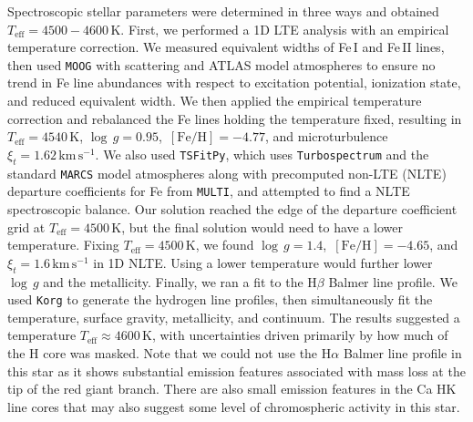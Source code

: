 \documentclass{natureprintstyle}
\newcommand{\code}[1]{\texttt{#1}\xspace}
\newcommand{\unit}[1]{\ensuremath{\mathrm{\,#1}}\xspace}
\newcommand{\feh}{\unit{[Fe/H]}}
\newcommand{\teff}{\ensuremath{T_\mathrm{eff}}\xspace}
\newcommand{\Teff}{\teff}
\newcommand{\logg}{\ensuremath{\log\,g}\xspace}
\newcommand{\kms}{\unit{km\,s^{-1}}}
\begin{document}
Spectroscopic stellar parameters were determined in three ways and obtained $\Teff = 4500-4600$\,K.
First, we performed a 1D LTE analysis with an empirical temperature correction\cite{Frebel2013}.
We measured equivalent widths of Fe\,I and Fe\,II lines, then used \code{MOOG} with scattering\cite{Sneden1973,Sobeck2011,Sneden2012} and ATLAS model atmospheres\cite{Kurucz1979,Castelli2003} to ensure no trend in Fe line abundances with respect to excitation potential, ionization state, and reduced equivalent width.
We then applied the empirical temperature correction and rebalanced the Fe lines holding the temperature fixed, resulting in $\Teff=4540$\,K, $\logg=0.95$, $\feh=-4.77$, and microturbulence $\xi_t = 1.62\kms$.
We also used \code{TSFitPy}{\cite{Gerber2023}}, which uses \code{Turbospectrum}{\cite{Plez2012}} and the standard \code{MARCS} model atmospheres\cite{Gustafsson2008} along with precomputed non-LTE (NLTE) departure coefficients for Fe\cite{Bergemann2012b} from \code{MULTI}{\cite{Carlsson1986}}, and attempted to find a NLTE spectroscopic balance. Our solution reached the edge of the departure coefficient grid at $\Teff = 4500$\,K, but the final solution would need to have a lower temperature. Fixing $\Teff=4500$\,K, we found $\logg=1.4$, $\feh=-4.65$, and $\xi_t=1.6\kms$ in 1D NLTE. Using a lower temperature would further lower \logg and the metallicity.
Finally, we ran a fit to the H$\beta$ Balmer line profile. We used \code{Korg}\cite{Wheeler2023,Wheeler2024} to generate the hydrogen line profiles, then simultaneously fit the temperature, surface gravity, metallicity, and continuum\cite{Casey2017}.
The results suggested a temperature $\Teff \approx 4600$\,K, with uncertainties driven primarily by how much of the H core was masked.
Note that we could not use the H$\alpha$ Balmer line profile in this star as it shows substantial emission features associated with mass loss at the tip of the red giant branch.
There are also small emission features in the Ca HK line cores that may also suggest some level of chromospheric activity in this star.
\end{document}
